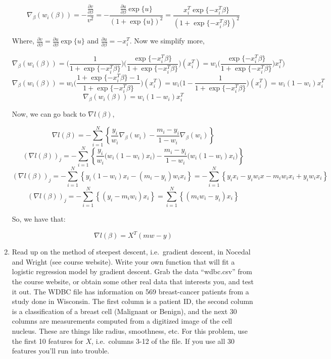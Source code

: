 \documentclass[11 pt]{article}
\begin{document}
\begin{enumerate}[label=(\Alph*)]
$$ \nabla_\beta(w_i(\beta))=-\frac{\frac{\partial v}{\partial \beta}}{v^2}=-\frac{\frac{\partial u}{\partial \beta}\exp\{u\}}{(1+\exp\{u\})^2}=\frac{x_i^T\exp\{-x_i^T \beta\}}{(1+\exp\{-x_i^T \beta\})^2}$$

Where, $\frac{\partial v}{\partial \beta}=\frac{\partial u}{\partial \beta}\exp\{u\}$ and $\frac{\partial u}{\partial \beta}=-x_i^T $. Now we simplify more,

 $$ \nabla_\beta(w_i(\beta))=\bigg(\frac{1}{1+\exp\{-x_i^T \beta\}}\bigg)\bigg( \frac{\exp\{-x_i^T \beta\}}{1+\exp\{-x_i^T \beta\}}\bigg)(x_i^T)=w_i \bigg(\frac{\exp\{-x_i^T \beta\}}{1+\exp\{-x_i^T \beta\}}\bigg)x_i^T) $$
 $$ \nabla_\beta(w_i(\beta))=w_i\bigg( \frac{1+\exp\{-x_i^T \beta\}-1}{1+\exp\{-x_i^T \beta\}}\bigg)(x_i^T)= w_i\bigg(1 - \frac{1}{1+\exp\{-x_i^T \beta\}}\bigg)(x_i^T)=w_i(1-w_i)x_i^T$$
 $$ \nabla_\beta(w_i(\beta))=w_i(1-w_i)x_i^T$$
 
 Now, we can go back to $\nabla l(\beta)$,
 
 $$  \nabla l(\beta) =  - \displaystyle\sum_{i=1}^{N}\left \{ \frac{y_i}{w_i}\nabla_\beta(w_i) - \frac{m_i - y_i}{1-w_i}\nabla_\beta(w_i) \right \} $$
 $$  (\nabla l(\beta) )_j= - \displaystyle\sum_{i=1}^{N}\left \{ \frac{y_i}{w_i}\bigg(w_i(1-w_i)x_i\bigg) - \frac{m_i - y_i}{1-w_i}\bigg(w_i(1-w_i)x_i\bigg) \right \} $$
 $$  (\nabla l(\beta) )_j= - \displaystyle\sum_{i=1}^{N}\left \{ y_i(1-w_i)x_i - (m_i - y_i)w_ix_i \right \}=- \displaystyle\sum_{i=1}^{N}\left \{ y_ix_i-y_iw_ix - m_iw_ix_i + y_iw_ix_i \right \} $$
 $$  (\nabla l(\beta) )_j = - \displaystyle\sum_{i=1}^{N}\left \{ (y_i - m_iw_i)x_i \right \} =  \displaystyle\sum_{i=1}^{N}\left \{ (m_iw_i - y_i)x_i \right \}$$
 
 So, we have that:
 
 $$  \nabla l(\beta) = X^T(mw-y)$$



\newpage
\item Read up on the method of steepest descent, i.e.~gradient descent, in Nocedal and Wright (see course website).  Write your own function that will fit a logistic regression model by gradient descent.  Grab the data ``wdbc.csv'' from the course website, or obtain some other real data that interests you, and test it out.  The WDBC file has information on 569 breast-cancer patients from a study done in Wisconsin.  The first column is a patient ID, the second column is a classification of a breast cell (Malignant or Benign), and the next 30 columns are measurements computed from a digitized image of the cell nucleus.  These are things like radius, smoothness, etc.  For this problem, use the first 10 features for $X$, i.e.~columns 3-12 of the file.  If you use all 30 features you'll run into trouble.


\end{enumerate}
\end{document}
